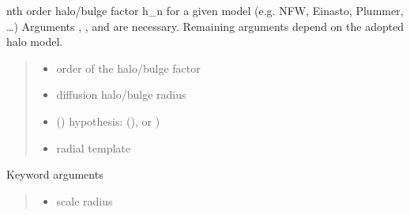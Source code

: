 \documentclass[letterpaper,10pt,english]{sphinxmanual}
\begin{document}
\begin{fulllineitems}
\label{\detokenize{diffsph.profiles:diffsph.profiles.hfactors.halo_factor}}
\pysigstartsignatures
{}
\pysigstopsignatures
\sphinxAtStartPar
n\sphinxhyphen{}th order halo/bulge factor h\_n for a given model (e.g. NFW, Einasto, Plummer, …) 
Arguments , ,  and  are necessary. Remaining arguments depend on the 
adopted halo model.
\begin{quote}\begin{description}
\begin{itemize}
\item {} 
\sphinxAtStartPar
{} \textendash{} order of the halo/bulge factor

\item {} 
\sphinxAtStartPar
{} \textendash{} diffusion halo/bulge radius

\item {} 
\sphinxAtStartPar
{} () \textendash{} hypothesis:  (),  or )

\item {} 
\sphinxAtStartPar
{} \textendash{} radial template

\end{itemize}

\end{description}\end{quote}

\sphinxAtStartPar
Keyword arguments
\begin{quote}\begin{description}
\begin{itemize}
\item {} 
\sphinxAtStartPar
{} \textendash{} scale radius


\end{itemize}
\end{description}
\end{quote}
\end{fulllineitems}
\end{document}
